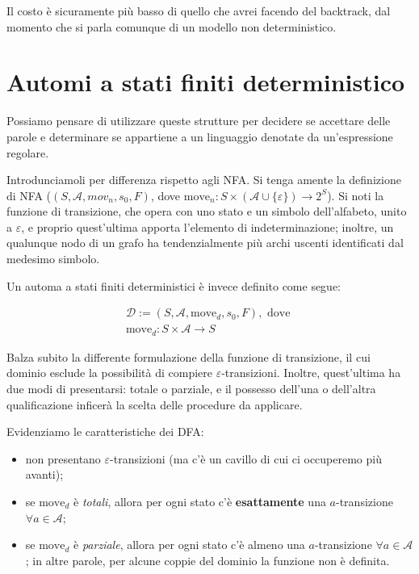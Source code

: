\documentclass[class=book, crop=false, oneside, 12pt]{standalone}
\begin{document}
Il costo è sicuramente più basso di quello che avrei facendo del backtrack, dal momento che si parla comunque di un modello non deterministico. 

\section{Automi a stati finiti deterministico}
Possiamo pensare di utilizzare queste strutture per decidere se accettare delle parole e determinare se appartiene a un linguaggio denotate da un'espressione regolare.

Introdunciamoli per differenza rispetto agli NFA. Si tenga  amente la definizione di NFA (\((S, \mathcal{A}, mov_n, s_0, F)\), dove \(\textrm{move}_n : S \times (\mathcal{A} \cup \{\varepsilon\}) \to 2^S\)). Si noti la funzione di transizione, che opera con uno stato e un simbolo dell'alfabeto, unito a \(\varepsilon\), e proprio quest'ultima apporta l'elemento di indeterminazione; inoltre, un qualunque nodo di un grafo ha tendenzialmente più archi uscenti identificati dal medesimo simbolo.

Un automa a stati finiti deterministici è invece definito come segue:

\begin{gather*}
    \mathcal{D} := (S, \mathcal{A}, \textrm{move}_d, s_0, F), \textrm{ dove } \\
    \textrm{move}_d : S \times \mathcal{A} \to S
\end{gather*}

Balza subito la differente formulazione della funzione di transizione, il cui dominio esclude la possibilità di compiere \(\varepsilon\)-transizioni. Inoltre, quest'ultima ha due modi di presentarsi: totale o parziale, e il possesso dell'una o dell'altra qualificazione inficerà la scelta delle procedure da applicare.

Evidenziamo le caratteristiche dei DFA:

\begin{itemize}
    \item non presentano \(\varepsilon\)-transizioni (ma c'è un cavillo di cui ci occuperemo più avanti);
    \item se \(\textrm{move}_d\) è \emph{totali}, allora per ogni stato c'è \textbf{esattamente} una \(a\)-transizione \(\forall a \in \mathcal{A}\);
    \item se \(\textrm{move}_d\) è \emph{parziale}, allora per ogni stato c'è \textrm{almeno} una \(a\)-transizione \(\forall a \in \mathcal{A}\); in altre parole, per alcune coppie del dominio la funzione non è definita.
\end{itemize}
\end{document}

